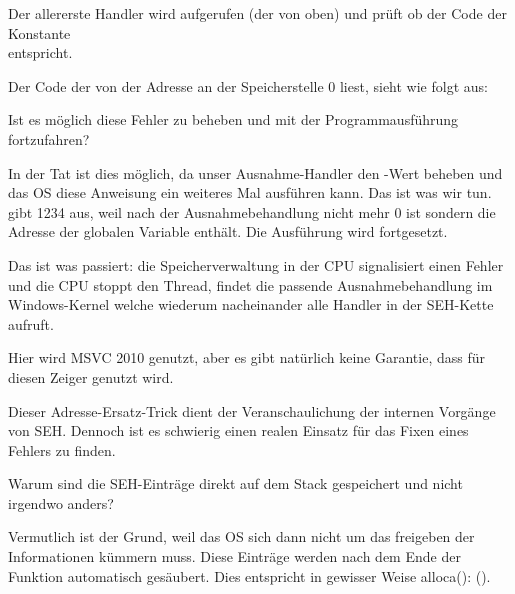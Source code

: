 Der allererste Handler wird aufgerufen (der von oben) und prüft ob der Code der Konstante\\
 entspricht.

Der Code der von der Adresse an der Speicherstelle 0 liest, sieht wie folgt aus:



Ist es möglich diese Fehler  zu beheben und mit der Programmausführung
fortzufahren?

In der Tat ist dies möglich, da unser Ausnahme-Handler den \EAX-Wert beheben und das
\ac{OS} diese Anweisung ein weiteres Mal ausführen kann.
Das ist was wir tun. \printf gibt 1234 aus, weil \EAX nach der Ausnahmebehandlung nicht
mehr 0 ist sondern die Adresse der globalen Variable  enthält.
Die Ausführung wird fortgesetzt.

Das ist was passiert: die Speicherverwaltung in der \ac{CPU} signalisiert einen Fehler und
die \ac{CPU} stoppt den Thread, findet die passende Ausnahmebehandlung im Windows-Kernel
welche wiederum nacheinander alle Handler in der \ac{SEH}-Kette aufruft.

Hier wird MSVC 2010 genutzt, aber es gibt natürlich keine Garantie, dass \EAX für diesen
Zeiger genutzt wird.

Dieser Adresse-Ersatz-Trick dient der Veranschaulichung der internen Vorgänge von \ac{SEH}.
Dennoch ist es schwierig einen realen Einsatz für das Fixen eines Fehlers 
zu finden.

Warum sind die SEH-Einträge direkt auf dem Stack gespeichert und nicht irgendwo anders?

Vermutlich ist der Grund, weil das \ac{OS} sich dann nicht um das freigeben der Informationen
kümmern muss. Diese Einträge werden nach dem Ende der Funktion automatisch gesäubert.
Dies entspricht in gewisser Weise alloca(): ().
